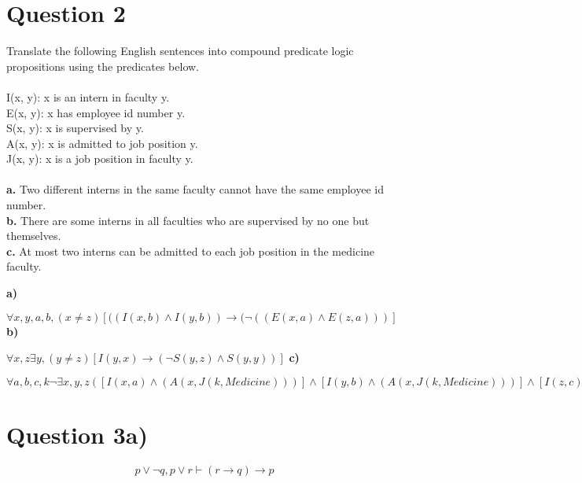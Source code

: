 \documentclass[a4paper,12pt]{article}
\begin{document}
\newpage



\newpage
\section*{Question 2 \hfill {}}
Translate the following English sentences into compound predicate logic propositions using the predicates
below. \\ \\
I(x, y): x is an intern in faculty y.\\ 
E(x, y): x has employee id number y.\\
S(x, y): x is supervised by y.\\
A(x, y): x is admitted to job position y.\\
J(x, y): x is a job position in faculty y.\\ \\

\textbf{a.} Two different interns in the same faculty cannot have the same employee id number.\\
\textbf{b.} There are some interns in all faculties who are supervised by no one but themselves.\\
\textbf{c.} At most two interns can be admitted to each job position in the medicine faculty.\\


\begin{tcolorbox}
   \textbf{a)}\item $ \forall x,y,a,b, (x \neq z) [( ( I(x,b) \wedge I(y,b)) \rightarrow (\neg( (E(x,a) \wedge E(z,a) )  ) ]$ \newline
   \textbf{b)}\item $ \forall x, z \exists y, (y\neq z)[ I(y,x) \rightarrow (\neg S(y,z)\wedge S(y,y))]$ \newline
   \textbf{c)}\item $ \forall a,b,c,k\neg \exists x,y,z ([I(x,a)\wedge (A(x,J(k,Medicine)))] \wedge [I(y,b)\wedge (A(x,J(k,Medicine)))] \wedge [I(z,c)\wedge (A(x,J(k,Medicine)))] \wedge x\neq y \wedge x\neq z \wedge y\neq z)$ \newline
\end{tcolorbox}
\newpage
\section*{Question 3a)\hfill \normalfont{}}
\begin{equation*}
p \vee \neg q , p \vee r \vdash (r \rightarrow q) \rightarrow p
\end{equation*}
\end{document}
